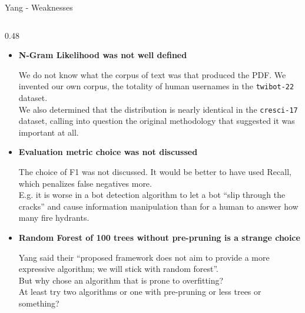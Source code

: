 \documentclass[aspectratio=169, 10pt]{beamer}
\begin{document}
\begin{frame}{Yang - Weaknesses}
\begin{columns}[T]
    \begin{column}{0.48\textwidth}
      \begin{itemize}
        \item \textbf{N-Gram Likelihood was not well defined}
          \begin{indentedblock}
            \tiny We do not know what the corpus of text was that produced the PDF. We invented our own corpus, the totality of human usernames in the \texttt{twibot-22} dataset.\\
            We also determined that the distribution is nearly identical in the \texttt{cresci-17} dataset, calling into question the original methodology that suggested it was important at all.
          \end{indentedblock}
        \item \textbf{Evaluation metric choice was not discussed}
          \begin{indentedblock}
            \tiny The choice of F1 was not discussed. It would be better to have used Recall, which penalizes false negatives more.\\
            E.g. it is worse in a bot detection algorithm to let a bot ``slip through the cracks'' and cause information manipulation than for a human to answer how many fire hydrants.
          \end{indentedblock}
        \item \textbf{Random Forest of 100 trees without pre-pruning is a strange choice}
          \begin{indentedblock}
            \tiny Yang said their ``proposed framework does not aim to provide a more expressive algorithm; we will stick with random forest''.\\
            But why chose an algorithm that is prone to overfitting?\\
            At least try two algorithms or one with pre-pruning or less trees or something?
          \end{indentedblock}
      \end{itemize}
    \end{column}
  \end{columns}
\end{frame}
\end{document}

